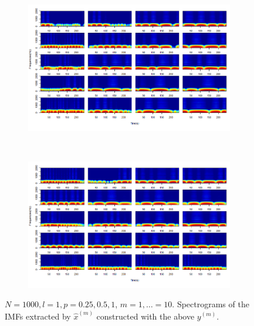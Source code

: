 \documentclass[11pt, a4paper]{article} %
\begin{document}
\begin{figure}[H]
\begin{subfigure}{1.1\textwidth}
  \centering
  \includegraphics[width=\linewidth]{spectro_N1000_l1_IMF_1_5.png}
  \label{fig:sfig1}
\end{subfigure}\\
\begin{subfigure}{1.1\textwidth}
  \centering
  \includegraphics[width=\linewidth]{spectro_N1000_l1_IMF_6_10.png}
  \label{fig:sfig2}
\end{subfigure}
\caption{$N = 1000, l = 1, p = 0.25, 0.5, 1$, $m = 1, \dots = 10$. Spectrograms of the IMFs extracted by $\hat{x}^{(m)}$ constructed with the above $y^{(m)}$.}
\label{fig:fig}
\end{figure}
\restoregeometry



\end{document}
